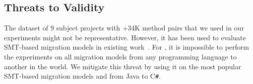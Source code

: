 \subsection{Threats to Validity}

The dataset of 9 subject projects with +34K method pairs that we used
in our experiments might not be representative. However, it has been
used to evaluate SMT-based migration models in existing
work~\cite{fse13,ase15,icsme16}. For {\model}, it is impossible to
perform the experiments on all migration models from any programming
language to another in the world. We mitigate this threat by using it
on the most popular SMT-based migration models and from Java to
C\texttt{\#}. 

